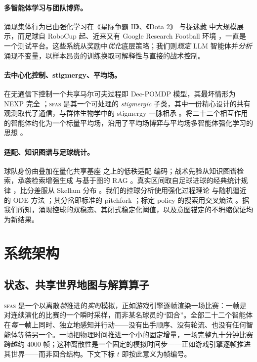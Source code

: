 \documentclass[11pt,UTF8,fontset=fandol]{ctexart}
\newcommand{\sfas}{\textsc{sfas}}
\theoremstyle{plain}
\theoremstyle{definition}
\theoremstyle{remark}
\begin{document}
\paragraph{多智能体学习与团队博弈。} 涌现集体行为已由强化学习在《星际争霸 II》\citep{vinyals2019}、《Dota 2》\citep{berner2019} 与捉迷藏 \citep{baker2020} 中大规模展示，而足球自 RoboCup \citep{kitano1997} 起、近来又有 Google Research Football 环境 \citep{kurach2020}，一直是一个测试平台。这些系统从奖励中\emph{优化}底层策略；我们则\emph{规定} LLM 智能体并\emph{分析}涌现不变量，以样本昂贵的训练换取可解释性与直接的战术控制。

\paragraph{去中心化控制、stigmergy、平均场。} 在无通信下控制一个共享马尔可夫过程即 Dec-POMDP 模型，其最坏情形为 NEXP 完全 \citep{bernstein2002}；\sfas{} 是其一个可处理的 \emph{stigmergic} 子类，其中一份精心设计的共有观测取代了通信，与群体生物学中的 stigmergy 一脉相承 \citep{theraulaz1999}。将二十二个相互作用的智能体约化为一个标量平均场，沿用了平均场博弈与平均场多智能体强化学习的思想 \citep{lasry2007,yang2018mfmarl}。

\paragraph{适配、知识图谱与足球统计。} 球队身份由叠加在量化共享基座 \citep{dettmers2023qlora} 之上的低秩适配 \citep{hu2021} 编码；战术先验从知识图谱检索，承袭检索增强生成 \citep{lewis2020} 与基于图的 RAG \citep{edge2024graphrag}。真实区间取自足球进球的经典统计规律 \citep{maher1982,dixon1997}，比分差服从 Skellam 分布 \citep{skellam1946}。我们的控球分析使用强化过程理论 \citep{pemantle2007} 与随机逼近的 ODE 方法 \citep{benaim1999,kushner2003}；其分岔即标准的 pitchfork \citep{strogatz1994}；标定 policy 的搜索用交叉熵法 \citep{rubinstein2004}。据我们所知，涌现控球的双稳态、其闭式稳定化阈值，以及意图锚定的不坍缩保证均为新结果。

\section{系统架构}\label{sec:arch}

\subsection{状态、共享世界地图与解算算子}

\sfas{} 是一个以离散\emph{帧}推进的\emph{实时}模拟，正如游戏引擎逐帧渲染一场比赛：一帧是对连续演化的比赛的一个瞬时采样，而非某名球员的“回合”。全部二十二个智能体在\emph{每一}帧上同时、独立地感知并行动——没有出手顺序、没有轮流、也没有任何智能体等待另一个。一帧把物理时间推进一个小的固定增量，一场完整九十分钟比赛跨越约 $4000$ 帧；这种离散性是一个固定的模拟时间步——正如游戏引擎逐帧推进其世界——而非回合结构。下文下标 $t$ 即按此意义为帧编号。
\end{document}
